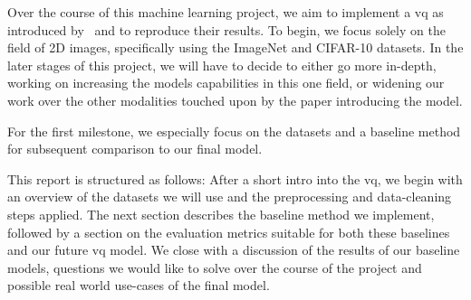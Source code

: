 
Over the course of this machine learning project, we aim to implement a \ac{vq} as introduced by~\cite{vqvae} and to reproduce their results.
To begin, we focus solely on the field of 2D images, specifically using the ImageNet and CIFAR-10 datasets.
In the later stages of this project, we will have to decide to either go more in-depth, working on increasing the models capabilities in this one field, or widening our work over the other modalities touched upon by the paper introducing the model.

For the first milestone, we especially focus on the datasets and a baseline method for subsequent comparison to our final model.

This report is structured as follows: After a short intro into the \ac{vq}, we begin with an overview of the datasets we will use and the preprocessing and data-cleaning steps applied.
The next section describes the baseline method we implement, followed by a section on the evaluation metrics suitable for both these baselines and our future \ac{vq} model.
We close with a discussion of the results of our baseline models, questions we would like to solve over the course of the project and possible real world use-cases of the final model.

